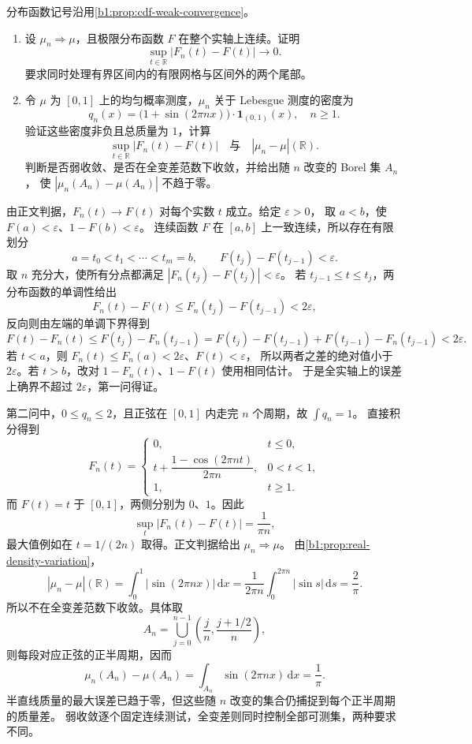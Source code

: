 \begin{exercise}[分布函数的一致误差与全变差]\label{b1:ex:12-distribution-functions}
分布函数记号沿用\cref{b1:prop:cdf-weak-convergence}。
\begin{enumerate}
\item\label{b1:item:12-cdf-criterion}
设 \(\mu_n\Rightarrow\mu\)，且极限分布函数 \(F\) 在整个实轴上连续。证明
\[
 \sup_{t\in\mathbb R}|F_n(t)-F(t)|\longrightarrow0.
\]
要求同时处理有界区间内的有限网格与区间外的两个尾部。
\item\label{b1:item:12-cdf-exponential}
令 \(\mu\) 为 \([0,1]\) 上的均匀概率测度，\(\mu_n\) 关于 Lebesgue 测度的密度为
\[
 q_n(x)=\bigl(1+\sin(2\pi nx)\bigr)\cdot\mathbf1_{(0,1)}(x),\quad n\ge1.
\]
验证这些密度非负且总质量为 \(1\)，计算
\[
 \sup_{t\in\mathbb R}|F_n(t)-F(t)|
 \quad\text{与}\quad |\mu_n-\mu|(\mathbb R).
\]
判断是否弱收敛、是否在全变差范数下收敛，并给出随 \(n\) 改变的 Borel 集 \(A_n\)，
使 \(|\mu_n(A_n)-\mu(A_n)|\) 不趋于零。
\end{enumerate}
\end{exercise}
\begin{solution}
由正文判据，\(F_n(t)\to F(t)\) 对每个实数 \(t\) 成立。给定 \(\varepsilon>0\)，
取 \(a<b\)，使 \(F(a)<\varepsilon\)、\(1-F(b)<\varepsilon\)。
连续函数 \(F\) 在 \([a,b]\) 上一致连续，所以存在有限划分
\[
 a=t_0<t_1<\cdots<t_m=b,
 \qquad F(t_j)-F(t_{j-1})<\varepsilon.
\]
取 \(n\) 充分大，使所有分点都满足 \(|F_n(t_j)-F(t_j)|<\varepsilon\)。
若 \(t_{j-1}\le t\le t_j\)，两分布函数的单调性给出
\[
 F_n(t)-F(t)
 \le F_n(t_j)-F(t_{j-1})<2\varepsilon,
\]
反向则由左端的单调下界得到
\[
 F(t)-F_n(t)
 \le F(t_j)-F_n(t_{j-1})
 =F(t_j)-F(t_{j-1})+F(t_{j-1})-F_n(t_{j-1})
 <2\varepsilon.
\]
若 \(t<a\)，则 \(F_n(t)\le F_n(a)<2\varepsilon\)、\(F(t)<\varepsilon\)，
所以两者之差的绝对值小于 \(2\varepsilon\)。若 \(t>b\)，改对 \(1-F_n(t)\)、\(1-F(t)\) 使用相同估计。
于是全实轴上的误差上确界不超过 \(2\varepsilon\)，第一问得证。

第二问中，\(0\le q_n\le2\)，且正弦在 \([0,1]\) 内走完 \(n\) 个周期，故 \(\int q_n=1\)。
直接积分得到
\[
 F_n(t)=
 \begin{cases}
  0,&t\le0,\\
  t+\dfrac{1-\cos(2\pi nt)}{2\pi n},&0<t<1,\\
  1,&t\ge1.
 \end{cases}
\]
而 \(F(t)=t\) 于 \([0,1]\)，两侧分别为 \(0\)、\(1\)。因此
\[
 \sup_t|F_n(t)-F(t)|=\frac1{\pi n},
\]
最大值例如在 \(t=1/(2n)\) 取得。正文判据给出 \(\mu_n\Rightarrow\mu\)。
由\cref{b1:prop:real-density-variation}，
\[
 |\mu_n-\mu|(\mathbb R)
 =\int_0^1|\sin(2\pi nx)|\,\mathrm dx
 =\frac1{2\pi n}\int_0^{2\pi n}|\sin s|\,\mathrm ds
 =\frac2\pi.
\]
所以不在全变差范数下收敛。具体取
\[
 A_n=\bigcup_{j=0}^{n-1}
       \left(\frac jn,\frac{j+1/2}n\right),
\]
则每段对应正弦的正半周期，因而
\[
 \mu_n(A_n)-\mu(A_n)
 =\int_{A_n}\sin(2\pi nx)\,\mathrm dx=\frac1\pi.
\]
半直线质量的最大误差已趋于零，但这些随 \(n\) 改变的集合仍捕捉到每个正半周期的质量差。
弱收敛逐个固定连续测试，全变差则同时控制全部可测集，两种要求不同。
\end{solution}

